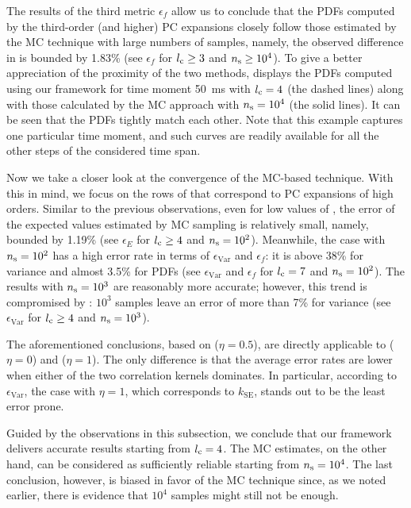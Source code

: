 The results of the third metric $\epsilon_f$ allow us to conclude that the PDFs
computed by the third-order (and higher) PC expansions closely follow those
estimated by the MC technique with large numbers of samples, namely, the
observed difference in  is bounded by 1.83\% (see
$\epsilon_f$ for ${l_\mathrm{c}} \geq 3$ and ${n_\mathrm{s}} \geq 10^4$). To give a better
appreciation of the proximity of the two methods,
 displays the PDFs computed using our framework
for time moment 50~ms with ${l_\mathrm{c}} = 4$ (the dashed lines) along with those
calculated by the MC approach with ${n_\mathrm{s}} = 10^4$ (the solid lines). It can be
seen that the PDFs tightly match each other. Note that this example captures one
particular time moment, and such curves are readily available for all the other
steps of the considered time span.

Now we take a closer look at the convergence of the MC-based technique. With
this in mind, we focus on the rows of  that correspond to
PC expansions of high orders. Similar to the previous observations, even for low
values of \ns, the error of the expected values estimated by MC sampling is
relatively small, namely, bounded by 1.19\% (see $\epsilon_E$ for ${l_\mathrm{c}} \geq 4$
and ${n_\mathrm{s}} = 10^2$). Meanwhile, the case with ${n_\mathrm{s}} = 10^2$ has a high error rate
in terms of $\epsilon_\mathrm{Var}$ and $\epsilon_f$: it is above 38\% for
variance and almost 3.5\% for PDFs (see $\epsilon_\mathrm{Var}$ and $\epsilon_f$
for ${l_\mathrm{c}} = 7$ and ${n_\mathrm{s}} = 10^2$). The results with ${n_\mathrm{s}} = 10^3$ are reasonably
more accurate; however, this trend is compromised by :
$10^3$ samples leave an error of more than 7\% for variance (see
$\epsilon_\mathrm{Var}$ for ${l_\mathrm{c}} \geq 4$ and ${n_\mathrm{s}} = 10^3$).

The aforementioned conclusions, based on  ($\eta = 0.5$),
are directly applicable to  ($\eta = 0$) and
 ($\eta = 1$). The only difference is that the average
error rates are lower when either of the two correlation kernels dominates. In
particular, according to $\epsilon_\mathrm{Var}$, the case with $\eta = 1$,
which corresponds to $k_\mathrm{SE}$, stands out to be the least error prone.

Guided by the observations in this subsection, we conclude that our framework
delivers accurate results starting from ${l_\mathrm{c}} = 4$. The MC estimates, on the
other hand, can be considered as sufficiently reliable starting from ${n_\mathrm{s}} =
10^4$. The last conclusion, however, is biased in favor of the MC technique
since, as we noted earlier, there is evidence that $10^4$ samples might still
not be enough.

